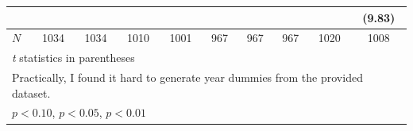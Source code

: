 \begin{table}[htbp]
\begin{tabular}{l*{9}{c}}
            &                     &                     &                     &                     &                     &                     &                     &                     &      (9.83)         \\
\hline
\(N\)       &        1034         &        1034         &        1010         &        1001         &         967         &         967         &         967         &        1020         &        1008         \\
\hline\hline
\multicolumn{10}{l}{\footnotesize \textit{t} statistics in parentheses}\\
\multicolumn{10}{l}{\footnotesize Practically, I found it hard to generate year dummies from the provided dataset.}\\
\multicolumn{10}{l}{\footnotesize \sym{*} \(p<0.10\), \sym{**} \(p<0.05\), \sym{***} \(p<0.01\)}\\
\end{tabular}
\end{table}
